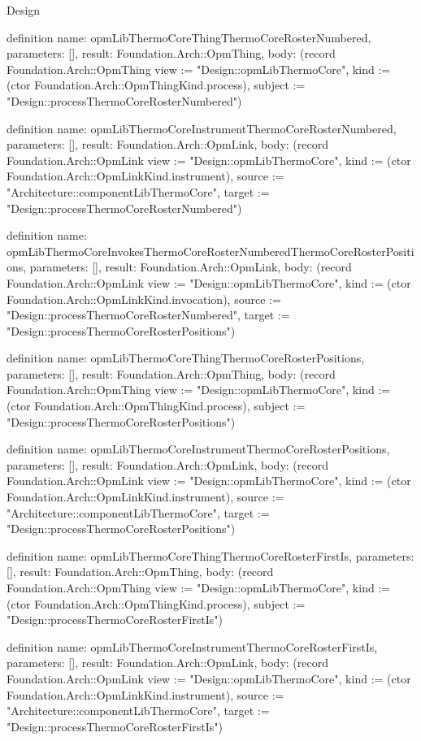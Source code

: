 \begin{lexlean}{Design}
\begin{semanticmodule}
definition{
  name: opmLibThermoCoreThingThermoCoreRosterNumbered,
  parameters: [],
  result: Foundation.Arch::OpmThing,
  body: (record Foundation.Arch::OpmThing {view := "Design::opmLibThermoCore", kind := (ctor Foundation.Arch::OpmThingKind.process), subject := "Design::processThermoCoreRosterNumbered"})
}

definition{
  name: opmLibThermoCoreInstrumentThermoCoreRosterNumbered,
  parameters: [],
  result: Foundation.Arch::OpmLink,
  body: (record Foundation.Arch::OpmLink {view := "Design::opmLibThermoCore", kind := (ctor Foundation.Arch::OpmLinkKind.instrument), source := "Architecture::componentLibThermoCore", target := "Design::processThermoCoreRosterNumbered"})
}

definition{
  name: opmLibThermoCoreInvokesThermoCoreRosterNumberedThermoCoreRosterPositions,
  parameters: [],
  result: Foundation.Arch::OpmLink,
  body: (record Foundation.Arch::OpmLink {view := "Design::opmLibThermoCore", kind := (ctor Foundation.Arch::OpmLinkKind.invocation), source := "Design::processThermoCoreRosterNumbered", target := "Design::processThermoCoreRosterPositions"})
}

definition{
  name: opmLibThermoCoreThingThermoCoreRosterPositions,
  parameters: [],
  result: Foundation.Arch::OpmThing,
  body: (record Foundation.Arch::OpmThing {view := "Design::opmLibThermoCore", kind := (ctor Foundation.Arch::OpmThingKind.process), subject := "Design::processThermoCoreRosterPositions"})
}

definition{
  name: opmLibThermoCoreInstrumentThermoCoreRosterPositions,
  parameters: [],
  result: Foundation.Arch::OpmLink,
  body: (record Foundation.Arch::OpmLink {view := "Design::opmLibThermoCore", kind := (ctor Foundation.Arch::OpmLinkKind.instrument), source := "Architecture::componentLibThermoCore", target := "Design::processThermoCoreRosterPositions"})
}

definition{
  name: opmLibThermoCoreThingThermoCoreRosterFirstIs,
  parameters: [],
  result: Foundation.Arch::OpmThing,
  body: (record Foundation.Arch::OpmThing {view := "Design::opmLibThermoCore", kind := (ctor Foundation.Arch::OpmThingKind.process), subject := "Design::processThermoCoreRosterFirstIs"})
}

definition{
  name: opmLibThermoCoreInstrumentThermoCoreRosterFirstIs,
  parameters: [],
  result: Foundation.Arch::OpmLink,
  body: (record Foundation.Arch::OpmLink {view := "Design::opmLibThermoCore", kind := (ctor Foundation.Arch::OpmLinkKind.instrument), source := "Architecture::componentLibThermoCore", target := "Design::processThermoCoreRosterFirstIs"})
}


\end{semanticmodule}
\end{lexlean}
